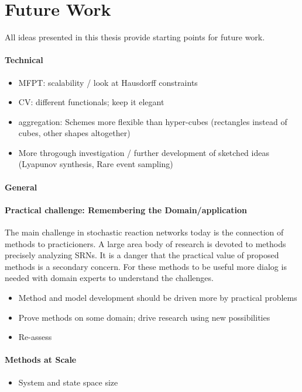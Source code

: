 \section{Future Work}
All ideas presented in this thesis provide starting points for future work.
\paragraph{Technical}
\begin{itemize}
    \item MFPT: scalability / look at Hausdorff constraints
    \item CV: different functionals; keep it elegant
    \item aggregation: Schemes more flexible than hyper-cubes (rectangles instead of cubes, other shapes altogether)
    \item More throgough investigation / further development of sketched ideas (Lyapunov synthesis, Rare event sampling)
\end{itemize}
\paragraph{General}
\paragraph{Practical challenge: Remembering the Domain/application} The main challenge in stochastic reaction networks today is the connection of methods to practicioners.
A large area body of research is devoted to methods precisely analyzing \acp{SRN}.
It is a danger that the practical value of proposed methods is a secondary concern.
For these methods to be useful more dialog is needed with domain experts to understand the challenges.
\begin{itemize}
  \item Method and model development should be driven more by practical problems
  \item Prove methods on some domain; drive research using new possibilities
  \item Re-assess 
\end{itemize}

\paragraph{Methods at Scale}
\begin{itemize}
  \item System and state space size
\end{itemize}
